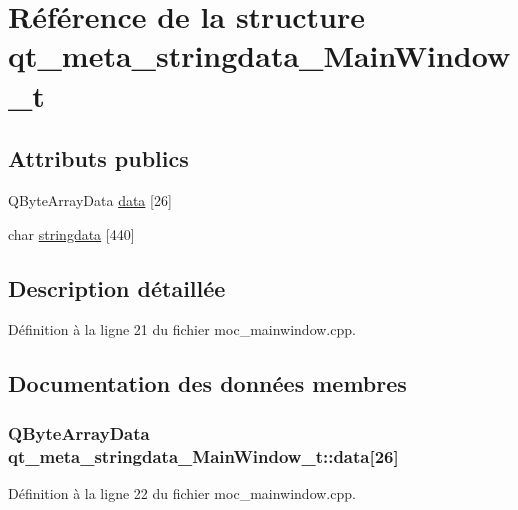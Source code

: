 \hypertarget{structqt__meta__stringdata___main_window__t}{\section{Référence de la structure qt\-\_\-meta\-\_\-stringdata\-\_\-\-Main\-Window\-\_\-t}
\label{structqt__meta__stringdata___main_window__t}
}
\subsection*{Attributs publics}
\begin{DoxyCompactItemize}
\item 
Q\-Byte\-Array\-Data \hyperlink{structqt__meta__stringdata___main_window__t_a48f255bc47fc5d9f118e582b8447d10a}{data} \mbox{[}26\mbox{]}
\item 
char \hyperlink{structqt__meta__stringdata___main_window__t_ae7c3346f4e1a9ac387ee6447ac66a309}{stringdata} \mbox{[}440\mbox{]}
\end{DoxyCompactItemize}


\subsection{Description détaillée}


Définition à la ligne 21 du fichier moc\-\_\-mainwindow.\-cpp.



\subsection{Documentation des données membres}
\hypertarget{structqt__meta__stringdata___main_window__t_a48f255bc47fc5d9f118e582b8447d10a}{
\subsubsection[{data}]{\setlength{\rightskip}{0pt plus 5cm}Q\-Byte\-Array\-Data qt\-\_\-meta\-\_\-stringdata\-\_\-\-Main\-Window\-\_\-t\-::data\mbox{[}26\mbox{]}}}\label{structqt__meta__stringdata___main_window__t_a48f255bc47fc5d9f118e582b8447d10a}


Définition à la ligne 22 du fichier moc\-\_\-mainwindow.\-cpp.

